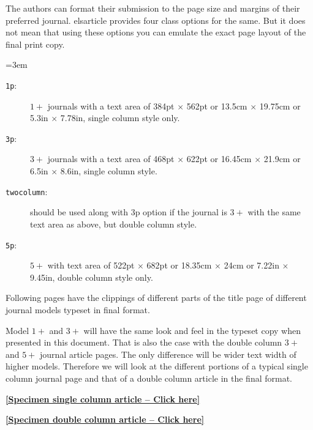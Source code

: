 \documentclass[a4paper,12pt]{article}
\def\file#1{\textsf{#1}\xspace}
\begin{document}
The authors can format their submission to the page size and margins
of their preferred journal.  \file{elsarticle} provides four
class options for the same. But it does not mean that using these
options you can emulate the exact page layout of the final print copy. 


\lmrgn=3em
\begin{description}
\item [\texttt{1p}:] $1+$ journals with a text area of
384pt $\times$ 562pt or 13.5cm $\times$ 19.75cm or 5.3in $\times$
7.78in, single column style only.

\item [\texttt{3p}:] $3+$ journals with a text area of 468pt
$\times$ 622pt or 16.45cm $\times$ 21.9cm or 6.5in $\times$
8.6in, single column style.

\item [\texttt{twocolumn}:] should be used along with 3p option if the
journal is $3+$ with the same text area as above, but double column
style. 

\item [\texttt{5p}:] $5+$ with text area of 522pt $\times$
682pt or 18.35cm $\times$ 24cm or 7.22in $\times$ 9.45in,
double column style only.
\end{description}

Following pages have the clippings of different parts of
the title page of different journal models typeset in final
format.

Model $1+$ and $3+$  will have the same look and
feel in the typeset copy when presented in this document. That is
also the case with the double column $3+$ and $5+$ journal article
pages. The only difference will be wider text width of
higher models.  Therefore we will look at the
different portions of a typical single column journal page and
that of a double column article in the final format.


\begin{center}
\hypertarget{bsc}{}
\hyperlink{sc}{
{\bf [Specimen single column article -- Click here]}
}


\hypertarget{bsc}{}
\hyperlink{dc}{
{\bf [Specimen double column article -- Click here]}
}
\end{center}

\src{}\hypertarget{sc}{}
\def\rulecolor{blue!70}
\hyperlink{bsc}{}
\def\rulecolor{orange}

\src{}\hypertarget{dc}{}
\def\rulecolor{blue!70}
\hyperlink{bsc}{}
\def\rulecolor{orange}
\end{document}
